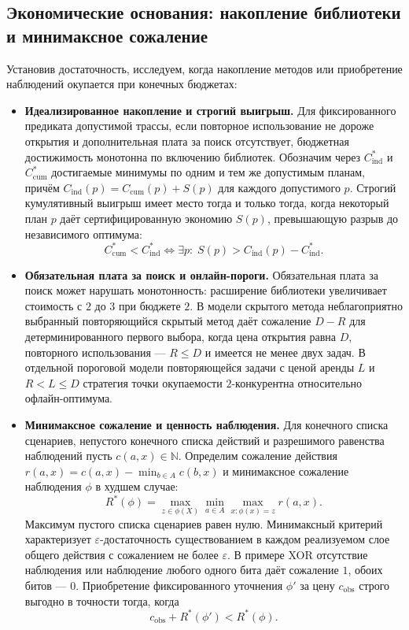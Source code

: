 \newpage
\subsection{Экономические основания: накопление библиотеки и минимаксное сожаление}
Установив достаточность, исследуем, когда накопление методов или приобретение наблюдений окупается при конечных бюджетах:
\begin{itemize}
    \item \textbf{Идеализированное накопление и строгий выигрыш.} Для фиксированного предиката допустимой трассы, если повторное использование не дороже открытия и дополнительная плата за поиск отсутствует, бюджетная достижимость монотонна по включению библиотек. Обозначим через $C_{\mathrm{ind}}^*$ и $C_{\mathrm{cum}}^*$ достигаемые минимумы по одним и тем же допустимым планам, причём $C_{\mathrm{ind}}(p)=C_{\mathrm{cum}}(p)+S(p)$ для каждого допустимого $p$. Строгий кумулятивный выигрыш имеет место тогда и только тогда, когда некоторый план $p$ даёт сертифицированную экономию $S(p)$, превышающую разрыв до независимого оптимума:
    \begin{equation}
    \label{eq:t15}
    C_{\mathrm{cum}}^* < C_{\mathrm{ind}}^* \iff \exists p :\; S(p) > C_{\mathrm{ind}}(p) - C_{\mathrm{ind}}^*.
    \end{equation}
    \item \textbf{Обязательная плата за поиск и онлайн-пороги.} Обязательная плата за поиск может нарушать монотонность: расширение библиотеки увеличивает стоимость с $2$ до $3$ при бюджете $2$. В модели скрытого метода неблагоприятно выбранный повторяющийся скрытый метод даёт сожаление $D-R$ для детерминированного первого выбора, когда цена открытия равна $D$, повторного использования --- $R\le D$ и имеется не менее двух задач. В отдельной пороговой модели повторяющейся задачи с ценой аренды $L$ и $R<L\le D$ стратегия точки окупаемости $2$-конкурентна относительно офлайн-оптимума.
    \item \textbf{Минимаксное сожаление и ценность наблюдения.} Для конечного списка сценариев, непустого конечного списка действий и разрешимого равенства наблюдений пусть $c(a,x)\in\mathbb N$. Определим сожаление действия $r(a,x) = c(a,x) - \min_{b \in A} c(b,x)$ и минимаксное сожаление наблюдения $\phi$ в худшем случае:
    \begin{equation}
    \label{eq:t18-regret}
    R^*(\phi) = \max_{z \in \phi(X)} \min_{a \in A} \max_{x : \phi(x)=z} r(a,x).
    \end{equation}
    Максимум пустого списка сценариев равен нулю. Минимаксный критерий характеризует $\varepsilon$-достаточность существованием в каждом реализуемом слое общего действия с сожалением не более $\varepsilon$. В примере XOR отсутствие наблюдения или наблюдение любого одного бита даёт сожаление $1$, обоих битов --- $0$. Приобретение фиксированного уточнения $\phi'$ за цену $c_{\mathrm{obs}}$ строго выгодно в точности тогда, когда
    \begin{equation}
    \label{eq:t18-acq}
    c_{\mathrm{obs}} + R^*(\phi') < R^*(\phi).
    \end{equation}
\end{itemize}

